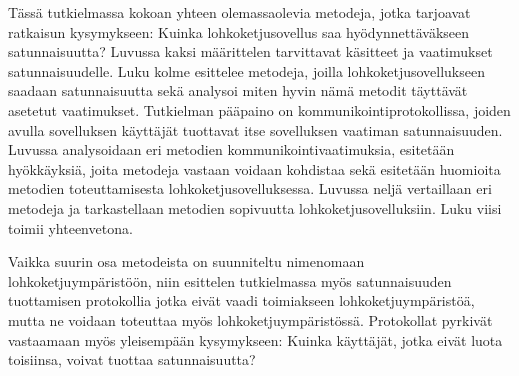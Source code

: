 Tässä tutkielmassa kokoan yhteen olemassaolevia metodeja, jotka tarjoavat ratkaisun kysymykseen: Kuinka lohkoketjusovellus saa hyödynnettäväkseen satunnaisuutta? Luvussa kaksi määrittelen tarvittavat käsitteet ja vaatimukset satunnaisuudelle. Luku kolme esittelee metodeja, joilla lohkoketjusovellukseen saadaan satunnaisuutta sekä analysoi miten hyvin nämä metodit täyttävät asetetut vaatimukset. Tutkielman pääpaino on kommunikointiprotokollissa, joiden avulla sovelluksen käyttäjät tuottavat itse sovelluksen vaatiman satunnaisuuden. Luvussa analysoidaan eri metodien kommunikointivaatimuksia, esitetään hyökkäyksiä, joita metodeja vastaan voidaan kohdistaa sekä esitetään huomioita metodien toteuttamisesta lohkoketjusovelluksessa. Luvussa neljä vertaillaan eri metodeja ja tarkastellaan metodien sopivuutta lohkoketjusovelluksiin. Luku viisi toimii yhteenvetona.

Vaikka suurin osa metodeista on suunniteltu nimenomaan lohkoketjuympäristöön, niin esittelen tutkielmassa myös satunnaisuuden tuottamisen protokollia jotka eivät vaadi toimiakseen lohkoketjuympäristöä, mutta ne voidaan toteuttaa myös lohkoketjuympäristössä. Protokollat pyrkivät vastaamaan myös yleisempään kysymykseen: Kuinka käyttäjät, jotka eivät luota toisiinsa, voivat tuottaa satunnaisuutta? 
